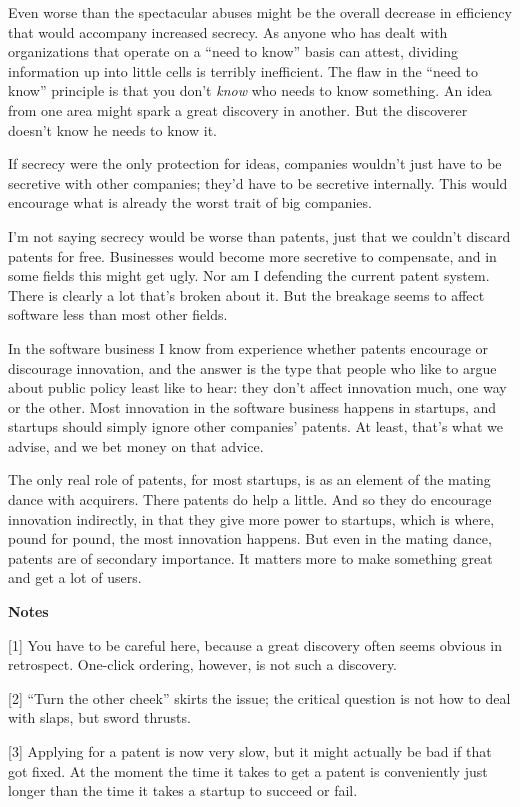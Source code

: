 Even worse than the spectacular abuses might be the overall decrease in
efficiency that would accompany increased secrecy. As anyone who has
dealt with organizations that operate on a ``need to know'' basis can
attest, dividing information up into little cells is terribly
inefficient. The flaw in the ``need to know'' principle is that you
don't \emph{know} who needs to know something. An idea from one area
might spark a great discovery in another. But the discoverer doesn't
know he needs to know it.

If secrecy were the only protection for ideas, companies wouldn't just
have to be secretive with other companies; they'd have to be secretive
internally. This would encourage what is already the worst trait of big
companies.

I'm not saying secrecy would be worse than patents, just that we
couldn't discard patents for free. Businesses would become more
secretive to compensate, and in some fields this might get ugly. Nor am
I defending the current patent system. There is clearly a lot that's
broken about it. But the breakage seems to affect software less than
most other fields.

In the software business I know from experience whether patents
encourage or discourage innovation, and the answer is the type that
people who like to argue about public policy least like to hear: they
don't affect innovation much, one way or the other. Most innovation in
the software business happens in startups, and startups should simply
ignore other companies' patents. At least, that's what we advise, and we
bet money on that advice.

The only real role of patents, for most startups, is as an element of
the mating dance with acquirers. There patents do help a little. And so
they do encourage innovation indirectly, in that they give more power to
startups, which is where, pound for pound, the most innovation happens.
But even in the mating dance, patents are of secondary importance. It
matters more to make something great and get a lot of users.

\textbf{Notes}

{[}1{]} You have to be careful here, because a great discovery often
seems obvious in retrospect. One-click ordering, however, is not such a
discovery.

{[}2{]} ``Turn the other cheek'' skirts the issue; the critical question
is not how to deal with slaps, but sword thrusts.

{[}3{]} Applying for a patent is now very slow, but it might actually be
bad if that got fixed. At the moment the time it takes to get a patent
is conveniently just longer than the time it takes a startup to succeed
or fail.

